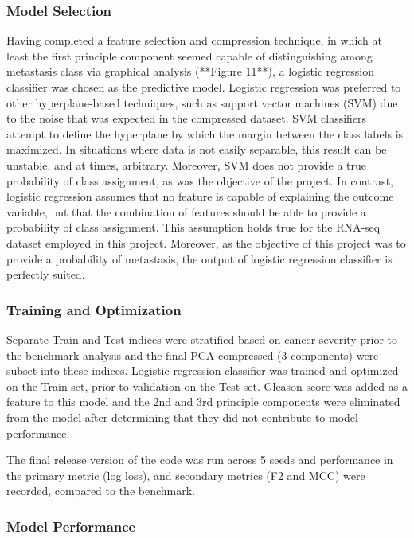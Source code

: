\documentclass[final]{article}
\begin{document}
\subsubsection{Model Selection}

Having completed a feature selection and compression technique, in which at
least the first principle component seemed capable of distinguishing among
metastasis class via graphical analysis (**Figure 11**), a logistic regression
classifier was chosen as the predictive model.  Logistic regression was
preferred  to other hyperplane-based techniques, such as support vector
machines (SVM) due to the noise that was expected in the compressed dataset.
SVM classifiers attempt to define the hyperplane by which the margin between
the class labels is maximized.  In situations where data is not easily
separable, this result can be unstable, and  at times, arbitrary.  Moreover,
SVM does not provide a true probability of class assignment, as was the
objective of the project.  In contrast, logistic regression assumes that no
feature  is capable of explaining the outcome variable, but that the
combination of features  should be able to provide a probability of class
assignment.  This assumption holds true for the RNA-seq dataset employed in
this project.  Moreover, as the objective of this project was to provide a
probability of metastasis, the output of logistic regression classifier is
perfectly suited.

\subsubsection{Training and Optimization}

Separate Train and Test indices were stratified based on cancer severity prior
to the benchmark analysis and the final PCA compressed (3-components) were
subset into these indices.  Logistic regression classifier was trained and
optimized on the Train set, prior to validation on the Test set.  Gleason score
was added as a feature to this model and the 2nd and 3rd principle components
were eliminated from the model after determining that they did not contribute to
model performance.

The final release version of the code was run across 5 seeds and performance in
the primary metric (log loss), and secondary metrics (F2 and MCC) were recorded,
compared to the benchmark.

\subsubsection{Model Performance}
\end{document}
